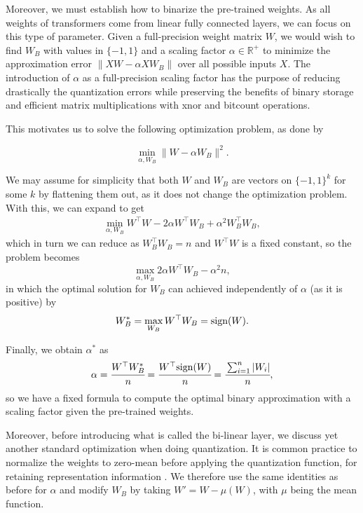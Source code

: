 Moreover, we must establish how to binarize the pre-trained weights. As all weights of transformers come from linear fully connected layers, we can focus on this type of parameter. Given a full-precision weight matrix $W$, we would wish to find $W_B$ with values in $\{-1, 1\}$ and a scaling factor $\alpha \in \mathbb{R}^+$ to minimize the approximation error $\|XW - \alpha XW_B \|$ over all possible inputs $X$. The introduction of $\alpha$ as a full-precision scaling factor has the purpose of reducing drastically the quantization errors \cite{rastegari2016xnornet} while preserving the benefits of binary storage and efficient matrix multiplications with xnor and bitcount operations.

This motivates us to solve the following optimization problem, as done by \cite{rastegari2016xnornet} 

\begin{equation}
\label{eq:optim_bin}
    \min_{\alpha, W_B} \| W - \alpha W_B \|^2.
\end{equation}

We may assume for simplicity that both $W$ and $W_B$ are vectors on $\{-1, 1\}^k$ for some $k$ by flattening them out, as it does not change the optimization problem. With this, we can expand to get
\begin{align}
    \min_{\alpha, W_B} W^\top W - 2\alpha W^\top W_B + \alpha^2 W_B^\top W_B,
\end{align}
which in turn we can reduce as $W_B^\top W_B = n$ and $W^\top W$ is a fixed constant, so the problem becomes
\begin{equation}
    \max_{\alpha, W_B} 2\alpha W^\top W_B - \alpha^2 n,
\end{equation}
in which the optimal solution for $W_B$ can achieved independently of $\alpha$ (as it is positive) by 
\begin{equation}
    W_B^* = \max_{W_B} W^\top W_B = \text{sign}(W).
\end{equation}

Finally, we obtain $\alpha^*$ as 
\begin{equation}
    \alpha = \cfrac{W^\top W_B^*}{n} = \cfrac{W^\top \text{sign}(W)}{n} = \cfrac{\sum_{i=1}^n |W_i|}{n},
\end{equation}
so we have a fixed formula to compute the optimal binary approximation with a scaling factor given the pre-trained weights. 

Moreover, before introducing what is called the bi-linear layer, we discuss yet another standard optimization when doing quantization. It is common practice to normalize the weights to zero-mean before applying the quantization function, for retaining representation information \cite{qin2020forward}. We therefore use the same identities as before for $\alpha$ and modify $W_B$ by taking $W' = W - \mu(W)$, with $\mu$ being the mean function.


